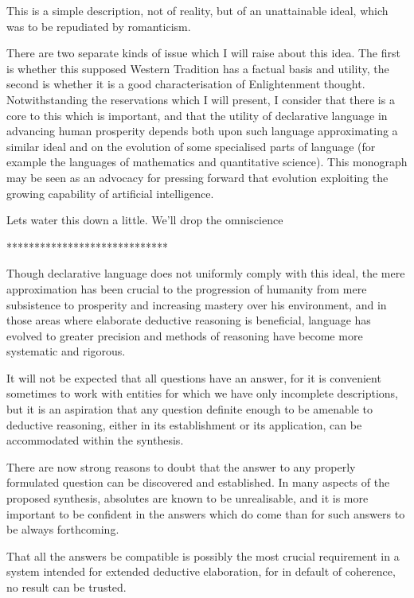 This is a simple description, not of reality, but of an unattainable ideal, which was to be repudiated by romanticism.

There are two separate kinds of issue which I will raise about this idea.
The first is whether this supposed Western Tradition has a factual basis and utility, the second is whether it is a good characterisation of Enlightenment thought.
Notwithstanding the reservations which I will present, I consider that there is a core to this which is important, and that the utility of declarative language in advancing human prosperity depends both upon such language approximating a similar ideal and on the evolution of some specialised parts of language (for example the languages of mathematics and quantitative science).
This monograph may be seen as an advocacy for pressing forward that evolution exploiting the growing capability of artificial intelligence.

Lets water this down a little.
We'll drop the omniscience 

\begin{centering}
*****************************
\end{centering}
  
Though declarative language does not uniformly comply with this ideal, the mere approximation has been crucial to the progression of humanity from mere subsistence to prosperity and increasing mastery over his environment, and in those areas where elaborate deductive reasoning is beneficial, language has evolved to greater precision and methods of reasoning have become more systematic and rigorous.

It will not be expected that all questions have an answer, for it is convenient sometimes to work with entities for which we have only incomplete descriptions, but it is an aspiration that any question definite enough to be amenable to deductive reasoning, either in its establishment or its application, can be accommodated within the synthesis.

There are now strong reasons to doubt that the answer to any properly formulated question can be discovered and established.
In many aspects of the proposed synthesis, absolutes are known to be unrealisable, and it is more important to be confident in the answers which do come than for such answers to be always forthcoming.

That all the answers be compatible is possibly the most crucial requirement in a system intended for extended deductive elaboration, for in default of coherence, no result can be trusted.

